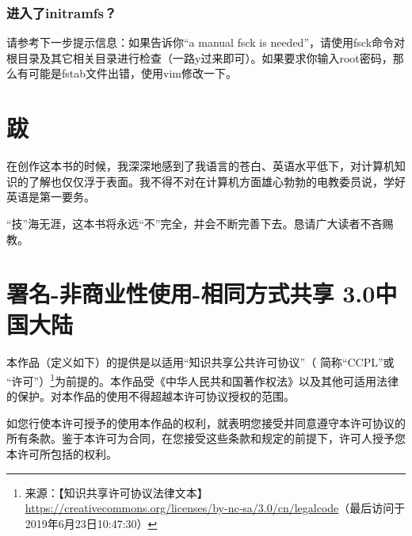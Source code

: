 \documentclass{book}
\begin{document}
\subsection{进入了initramfs？}
请参考下一步提示信息：如果告诉你“a manual fsck is needed”，请使用fsck命令对根目录及其它相关目录进行检查（一路y过来即可）。如果要求你输入root密码，那么有可能是fstab文件出错，使用vim修改一下。
\backmatter
\appendix
\chapter{跋}
在创作这本书的时候，我深深地感到了我语言的苍白、英语水平低下，对计算机知识的了解也仅仅浮于表面。我不得不对在计算机方面雄心勃勃的电教委员说，学好英语是第一要务。\par
“技”海无涯，这本书将永远“不”完全，并会不断完善下去。恳请广大读者不吝赐教。
\chapter{署名-非商业性使用-相同方式共享 3.0中国大陆}
本作品（定义如下）的提供是以适用“知识共享公共许可协议”（ 简称“CCPL”或 “许可”）\footnote{来源：【知识共享许可协议法律文本】\url{https://creativecommons.org/licenses/by-nc-sa/3.0/cn/legalcode}（最后访问于2019年6月23日10:47:30）}为前提的。本作品受《中华人民共和国著作权法》以及其他可适用法律的保护。对本作品的使用不得超越本许可协议授权的范围。\par
如您行使本许可授予的使用本作品的权利，就表明您接受并同意遵守本许可协议的所有条款。鉴于本许可为合同，在您接受这些条款和规定的前提下，许可人授予您本许可所包括的权利。
\end{document}
